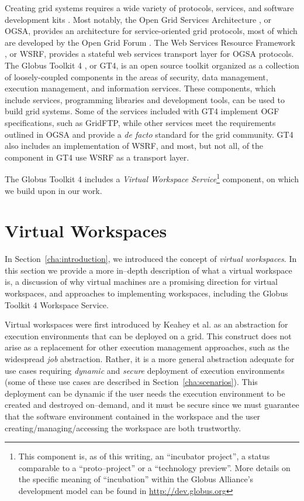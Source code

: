 \documentclass[singlespace]{ccw_chithesis}
\begin{document}
Creating grid systems requires a wide variety of protocols, services, and software development kits \cite{anatomy}. Most notably, the Open Grid Services Architecture \cite{physiology, ogsa, ogsaweb}, or OGSA, provides an architecture for service-oriented grid protocols, most of which are developed by the Open Grid Forum \cite{ogfweb}. The Web Services Resource Framework \cite{wsrfweb}, or WSRF, provides a stateful web services transport layer for OGSA protocols. The Globus Toolkit 4 \cite{globusweb,gt4book}, or GT4,  is an open source toolkit organized as a collection of loosely-coupled components in the areas of security, data management, execution management, and information services. These components, which include services, programming libraries and development tools, can be used to build grid systems. Some of the services included with GT4 implement OGF specifications, such as GridFTP, while other services meet the requirements outlined in OGSA and provide a \emph{de facto} standard for the grid community. GT4 also includes an implementation of WSRF, and most, but not all, of the component in GT4 use WSRF as a transport layer.

The Globus Toolkit 4 includes a \emph{Virtual Workspace Service}\footnote{This component is, as of this writing, an ``incubator project'', a status comparable to a ``proto--project'' or a ``technology preview''. More details on the specific meaning of ``incubation'' within the Globus Alliance's development model can be found in \url{http://dev.globus.org}} component, on which we build upon in our work.

\section{Virtual Workspaces}
\label{sec:vw}

In Section~\ref{cha:introduction}, we introduced the concept of \emph{virtual workspaces}. In this section we provide a more in--depth description of what a virtual workspace is, a discussion of why virtual machines are a promising direction for virtual workspaces, and approaches to implementing workspaces, including the Globus Toolkit 4 Workspace Service.

Virtual workspaces were first introduced by Keahey et al. \cite{VirtualWorkspaces05} as an abstraction for execution environments that can be deployed on a grid. This construct does not arise as a replacement for other execution management approaches, such as the widespread \emph{job} abstraction. Rather, it is a more general abstraction adequate for use cases requiring \emph{dynamic} and \emph{secure} deployment of execution environments (some of these use cases are described in Section~\ref{cha:scenarios}). This deployment can be dynamic if the user needs the execution environment to be created and destroyed on--demand, and it must be secure since we must guarantee that the software environment contained in the workspace and the user creating/managing/accessing the workspace are both trustworthy.
\end{document}
